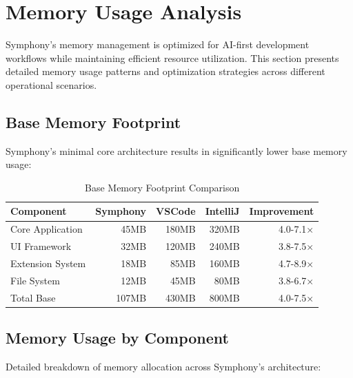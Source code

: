 \section*{Memory Usage Analysis}

Symphony's memory management is optimized for AI-first development workflows while maintaining efficient resource utilization. This section presents detailed memory usage patterns and optimization strategies across different operational scenarios.

\subsection*{Base Memory Footprint}

Symphony's minimal core architecture results in significantly lower base memory usage:

\begin{table}[ht]
\centering
\caption{Base Memory Footprint Comparison}
\label{tab:base-memory}
\begin{tabular}{@{}lrrrr@{}}
\toprule
\textbf{Component} & \textbf{Symphony} & \textbf{VSCode} & \textbf{IntelliJ} & \textbf{Improvement} \\
\midrule
Core Application & 45MB & 180MB & 320MB & 4.0-7.1× \\
UI Framework & 32MB & 120MB & 240MB & 3.8-7.5× \\
Extension System & 18MB & 85MB & 160MB & 4.7-8.9× \\
File System & 12MB & 45MB & 80MB & 3.8-6.7× \\
Total Base & 107MB & 430MB & 800MB & 4.0-7.5× \\
\bottomrule
\end{tabular}
\end{table}

\subsection*{Memory Usage by Component}

Detailed breakdown of memory allocation across Symphony's architecture:

